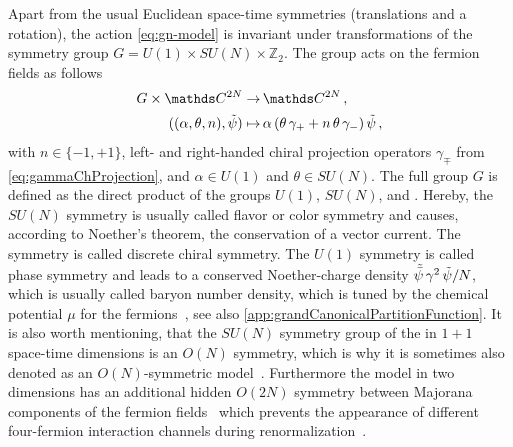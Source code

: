 Apart from the usual Euclidean space-time symmetries (translations and a rotation), the action \eqref{eq:gn-model} is invariant under transformations of the symmetry group ${G = U(1) \times SU(N) \times \mathds{Z}_2}$. The group acts on the fermion fields as follows 
\begin{subequations}\label{eq:gn-group-action}
\begin{align}
	G \times \Complex{}^{2 N} \to \, & \Complex{}^{2 N} \, ,\\[.1em]
	( ( \alpha, \theta, n ), \Fpsi ) \mapsto \, & \alpha \, ( \theta \, \gamma_+ + n \, \theta \, \gamma_- ) \, \Fpsi \, ,
\end{align}
\end{subequations}
with $n \in \{-1, +1\}$, left- and right-handed chiral projection operators $\gamma_{\mp}$ from \cref{eq:gammaChProjection}, and $\alpha \in U ( 1 )$ and $\theta \in SU ( N )$. 
The full group $G$ is defined as the direct product of the groups $U(1)$, $SU(N)$, and \ZII{}.
Hereby, the $SU(N)$ symmetry is usually called flavor or color symmetry and causes, according to Noether's theorem, the conservation of a vector current.
The \ZII{} symmetry is called discrete chiral symmetry.
The $U(1)$ symmetry is called phase symmetry and leads to a conserved Noether-charge density $\tilde{\bar{\psi}} \, \gamma^2 \, \tilde{\psi}/N$, which is usually called baryon number density, which is tuned by the chemical potential $\mu$ for the fermions~\cite{Fitzner:2010nv,Dunne:2011wu,Thies:2017fkr,Lenz:2020cuv}, see also \cref{app:grandCanonicalPartitionFunction}.
It is also worth mentioning, that the $SU(N)$ symmetry group of the \gnm{} in $1 + 1$ space-time dimensions is an $O(N)$ symmetry, which is why it is sometimes also denoted as an $O(N)$-symmetric model~\cite{Jacobs:1974ys,ZinnJustin:2002ru}. Furthermore the \gn{} model in two dimensions has an additional hidden $O(2N)$ symmetry between Majorana components of the fermion fields~\cite{Dashen:1975xh} which prevents the appearance of different four-fermion interaction channels during renormalization~\cite{Luperini:1991sv}.\bigskip

